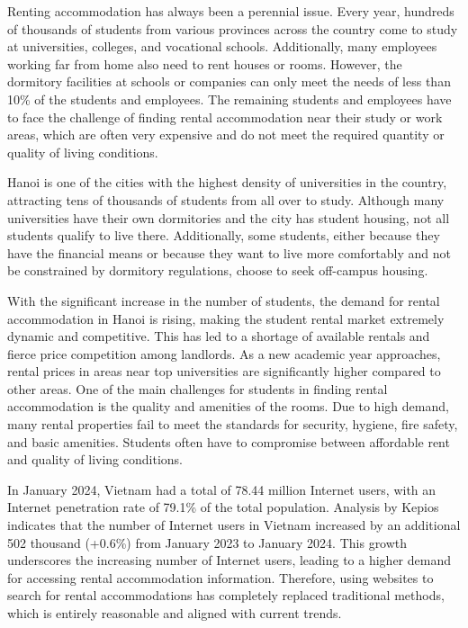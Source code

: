 \documentclass[../Main.tex]{subfiles}
\begin{document}
Renting accommodation has always been a perennial issue.
Every year, hundreds of thousands of students from various provinces across the country come to study at universities, colleges, and vocational schools.
Additionally, many employees working far from home also need to rent houses or rooms.
However, the dormitory facilities at schools or companies can only meet the needs of less than 10\% of the students and employees.
The remaining students and employees have to face the challenge of finding rental accommodation near their study or work areas, which are often very expensive and do not meet the required quantity or quality of living conditions.

Hanoi is one of the cities with the highest density of universities in the country, attracting tens of thousands of students from all over to study.
Although many universities have their own dormitories and the city has student housing, not all students qualify to live there.
Additionally, some students, either because they have the financial means or because they want to live more comfortably and not be constrained by dormitory regulations, choose to seek off-campus housing.

With the significant increase in the number of students, the demand for rental accommodation in Hanoi is rising, making the student rental market extremely dynamic and competitive.
This has led to a shortage of available rentals and fierce price competition among landlords.
As a new academic year approaches, rental prices in areas near top universities are significantly higher compared to other areas.
One of the main challenges for students in finding rental accommodation is the quality and amenities of the rooms.
Due to high demand, many rental properties fail to meet the standards for security, hygiene, fire safety, and basic amenities.
Students often have to compromise between affordable rent and quality of living conditions.

In January 2024, Vietnam had a total of 78.44 million Internet users, with an Internet penetration rate of 79.1\% of the total population.
Analysis by Kepios indicates that the number of Internet users in Vietnam increased by an additional 502 thousand (+0.6\%) from January 2023 to January 2024.
This growth underscores the increasing number of Internet users, leading to a higher demand for accessing rental accommodation information.
Therefore, using websites to search for rental accommodations has completely replaced traditional methods, which is entirely reasonable and aligned with current trends.
\end{document}
